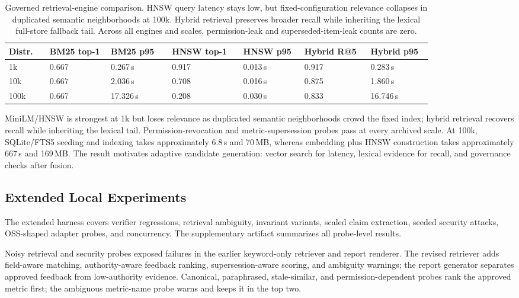 \documentclass[sigconf,nonacm]{acmart}
\begin{document}
\begin{table}[H]
\centering
\scriptsize
\setlength{\tabcolsep}{2.5pt}
\begin{tabular}{C{0.08\linewidth}C{0.12\linewidth}C{0.12\linewidth}C{0.14\linewidth}C{0.12\linewidth}C{0.13\linewidth}C{0.12\linewidth}}
\toprule
\textbf{Distr.} & \textbf{BM25 top-1} & \textbf{BM25 p95} & \textbf{HNSW top-1} & \textbf{HNSW p95} & \textbf{Hybrid R@5} & \textbf{Hybrid p95} \\
\midrule
1k & 0.667 & 0.267\,s & 0.917 & 0.013\,s & 0.917 & 0.283\,s \\
10k & 0.667 & 2.036\,s & 0.708 & 0.016\,s & 0.875 & 1.860\,s \\
100k & 0.667 & 17.326\,s & 0.208 & 0.030\,s & 0.833 & 16.746\,s \\
\bottomrule
\end{tabular}
\caption{Governed retrieval-engine comparison. HNSW query latency stays low, but fixed-configuration relevance collapses in duplicated semantic neighborhoods at 100k. Hybrid retrieval preserves broader recall while inheriting the lexical full-store fallback tail. Across all engines and scales, permission-leak and superseded-item-leak counts are zero.}
\label{tab:retrieval-engines}
\end{table}

MiniLM/HNSW is strongest at 1k but loses relevance as duplicated semantic neighborhoods crowd the fixed index; hybrid retrieval recovers recall while inheriting the lexical tail. Permission-revocation and metric-supersession probes pass at every archived scale. At 100k, SQLite/FTS5 seeding and indexing takes approximately 6.8\,s and 70\,MB, whereas embedding plus HNSW construction takes approximately 667\,s and 169\,MB. The result motivates adaptive candidate generation: vector search for latency, lexical evidence for recall, and governance checks after fusion.

\subsection{Extended Local Experiments}\label{sec:extended-experiments}
The extended harness covers verifier regressions, retrieval ambiguity, invariant variants, scaled claim extraction, seeded security attacks, OSS-shaped adapter probes, and concurrency. The supplementary artifact summarizes all probe-level results.

Noisy retrieval and security probes exposed failures in the earlier keyword-only retriever and report renderer. The revised retriever adds field-aware matching, authority-aware feedback ranking, supersession-aware scoring, and ambiguity warnings; the report generator separates approved feedback from low-authority evidence. Canonical, paraphrased, stale-similar, and permission-dependent probes rank the approved metric first; the ambiguous metric-name probe warns and keeps it in the top two.
\end{document}
